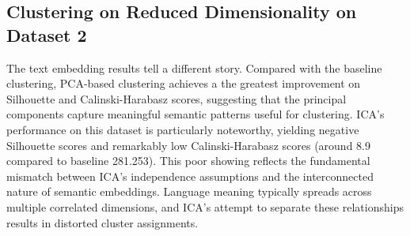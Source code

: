\documentclass[conference]{IEEEtran}
\begin{document}
\subsection{Clustering on Reduced Dimensionality on Dataset 2}
The text embedding results tell a different story. Compared with the baseline clustering, PCA-based clustering achieves a the greatest improvement on Silhouette and Calinski-Harabasz scores, suggesting that the principal components capture meaningful semantic patterns useful for clustering. ICA's performance on this dataset is particularly noteworthy, yielding negative Silhouette scores and remarkably low Calinski-Harabasz scores (around 8.9 compared to baseline 281.253). This poor showing reflects the fundamental mismatch between ICA's independence assumptions and the interconnected nature of semantic embeddings. Language meaning typically spreads across multiple correlated dimensions, and ICA's attempt to separate these relationships results in distorted cluster assignments. 
\end{document}
